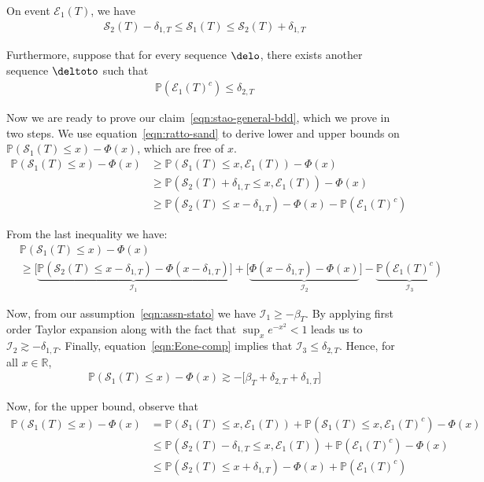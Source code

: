 \documentclass[11pt,letterpaper]{article}
\newcommand{\Prob}{\mathbb{P}}
\newcommand{\real}{\mathbb{R}}
\newcommand{\stao}{\mathcal{S}_1(T)}
\newcommand{\stato}{\mathcal{S}_2(T)}
\newcommand{\Eone}{\mathcal{E}_1(T)}
\theoremstyle{plain}
\theoremstyle{definition}  %
\begin{document}
\noindent On event $\Eone$, we have
\begin{align}\label{eqn:ratto-sand}
    \stato - \delta_{1,T} \leq \stao \leq \stato + \delta_{1,T}
\end{align}

\noindent Furthermore, suppose that for every sequence $\delo$, there exists another sequence $\deltoto$ such that
\begin{align}\label{eqn:Eone-comp}
    \Prob(\Eone^c)
     \leq \delta_{2,T}
\end{align}

\noindent Now we are ready to prove our claim~\eqref{eqn:stao-general-bdd}, which we prove in two steps. We use  equation~\eqref{eqn:ratto-sand} to derive lower and upper bounds on $\Prob(\stao \leq x)-\Phi(x)$, which are free of $x$. 
\begin{align*}
    \Prob(\stao \leq x) - \Phi(x)
    &\geq  \Prob(\stao \leq x, \Eone) - \Phi(x)\\[8pt]
    &\geq  \Prob(\stato + \delta_{1,T} \leq x, \Eone) - \Phi(x)\\[8pt]
    &\geq  \Prob(\stato \leq x -\delta_{1,T}) - \Phi(x) - \Prob(\Eone^c )
\end{align*}

\noindent From the last inequality we have:
\begin{align*}
    &\Prob(\stao \leq x) - \Phi(x)\\[8pt]
    & \geq \bigg[ \underbrace{\Prob(\stato \leq x-\delta_{1,T}) - \Phi(x-\delta_{1,T})}_{\mathcal{I}_1} \bigg]
    + \bigg[ \underbrace{\Phi(x-\delta_{1,T}) - \Phi(x)}_{\mathcal{I}_2} \bigg]
    - \underbrace{\Prob(\Eone^c)}_{\mathcal{I}_3}
\end{align*}

\noindent Now, from our assumption~\eqref{eqn:assn-stato} we have $\mathcal{I}_1 \geq -\beta_T$. By applying first order Taylor expansion along with the fact that $\sup_x e^{-x^2}<1$ leads us to $\mathcal{I}_2 \gtrsim -\delta_{1,T}$. Finally, equation~\eqref{eqn:Eone-comp} implies that $\mathcal{I}_3 \leq \delta_{2,T}$. Hence, for all $x\in \real$,
\begin{align}
  \Prob(\stao \leq x) - \Phi(x) \gtrsim - \bigg[\beta_T +\delta_{2,T} + \delta_{1,T} \bigg]  
\end{align}

\noindent Now, for the upper bound, observe that
\begin{align*}
    \Prob(\stao \leq x) - \Phi(x)
    &=\Prob(\stao \leq x, \Eone) + \Prob(\stao \leq x, \Eone^c) - \Phi(x)\\[8pt]
    &\leq  \Prob(\stato - \delta_{1,T} \leq x, \Eone) + \Prob(\Eone^c ) - \Phi(x)\\[8pt]
    &\leq  \Prob(\stato \leq x+ \delta_{1,T}) - \Phi(x) + \Prob(\Eone^c )
\end{align*}
\end{document}
